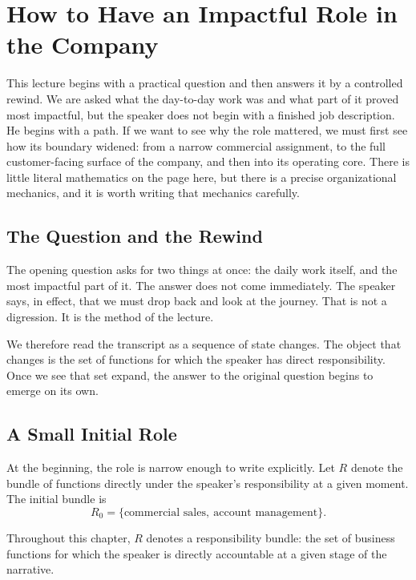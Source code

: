 \chapter{How to Have an Impactful Role in the Company}

This lecture begins with a practical question and then answers it by a controlled rewind. We are asked what the day-to-day work was and what part of it proved most impactful, but the speaker does not begin with a finished job description. He begins with a path. If we want to see why the role mattered, we must first see how its boundary widened: from a narrow commercial assignment, to the full customer-facing surface of the company, and then into its operating core. There is little literal mathematics on the page here, but there is a precise organizational mechanics, and it is worth writing that mechanics carefully.

\section{The Question and the Rewind}

The opening question asks for two things at once: the daily work itself, and the most impactful part of it. The answer does not come immediately. The speaker says, in effect, that we must drop back and look at the journey. That is not a digression. It is the method of the lecture.

We therefore read the transcript as a sequence of state changes. The object that changes is the set of functions for which the speaker has direct responsibility. Once we see that set expand, the answer to the original question begins to emerge on its own.

\section{A Small Initial Role}

At the beginning, the role is narrow enough to write explicitly. Let \(R\) denote the bundle of functions directly under the speaker's responsibility at a given moment. The initial bundle is
\begin{equation}
R_0 = \{\text{commercial sales},\ \text{account management}\}.
\end{equation}

\begin{definition}
Throughout this chapter, \(R\) denotes a responsibility bundle: the set of business functions for which the speaker is directly accountable at a given stage of the narrative.
\end{definition}

